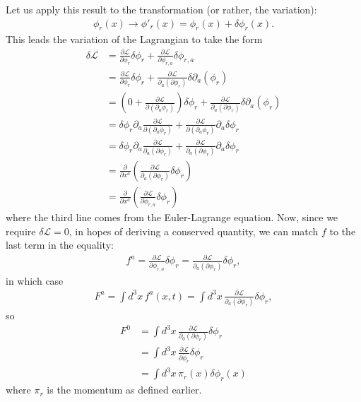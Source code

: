 \documentclass{book}
\numberwithin{equation}{section}
\theoremstyle{definition}
\newcommand{\p}{\partial}
\newcommand{\lag}{\mathcal{L}}
\begin{document}
Let us apply this result to the transformation (or rather, the variation):
\begin{align}
\phi_r(x) \to \phi'_r(x) = \phi_r(x) + \delta \phi_r(x).
\end{align}
This leads the variation of the Lagrangian to take the form
\begin{align}
\delta \lag &= \frac{\p \lag}{\p \phi_r}\delta \phi_r + \frac{\p\lag}{\p\phi_{r,a}}\delta \phi_{r,a}\\
&= \frac{\p \lag}{\p \phi_r}\delta \phi_r + \frac{\p\lag}{\p_a(\p\phi_r)}\delta \p_a(\phi_r)\\
&= \left(0 + \frac{\p\lag}{\p(\p_a\phi_r)}  \right)\delta \phi_r + \frac{\p\lag}{\p_a(\p\phi_r)}\delta \p_a(\phi_r)\\
&= \delta \phi_r\p_a \frac{\p\lag}{\p(\p_a\phi_r)} +  \frac{\p\lag}{\p(\p_a\phi_r)}\p_a\delta \phi_r\\
&= \delta \phi_r\p_a \frac{\p\lag}{\p_a(\p\phi_r)} +  \frac{\p\lag}{\p_a(\p\phi_r)}\p_a\delta \phi_r \\
&= \frac{\p}{\p x^a}\left( \frac{\p\lag}{\p_a(\p\phi_r)}\delta \phi_r \right)\\
&= \frac{\p}{\p x^a}\left( \frac{\p\lag}{\p\phi_{r,a}}\delta \phi_r \right)
\end{align}
where the third line comes from the Euler-Lagrange equation. Now, since we require $\delta \lag =0$, in hopes of deriving a conserved quantity, we can match $f$ to the last term in the equality:
\begin{align}
f^a = \frac{\p\lag}{\p\phi_{r,a}}\delta \phi_r = \frac{\p\lag}{\p_a(\p\phi_r)}\delta \phi_r,
\end{align}
in which case
\begin{align}
F^a = \int d^3x\, f^a(x,t) = \int d^3x\, \frac{\p\lag}{\p_a(\p\phi_r)}\delta \phi_r,
\end{align}
so
\begin{align}
F^0 &= \int d^3x\, \frac{\p\lag}{\p_0(\p\phi_r)}\delta \phi_r\\
& = \int d^3x\, \frac{\p\lag}{\p\dot{\phi}_r}\delta \phi_r\\
& = \int d^3x\, \pi_r(x)\delta \phi_r(x)
\end{align}
where $\pi_r$ is the momentum as defined earlier.\\
\end{document}
